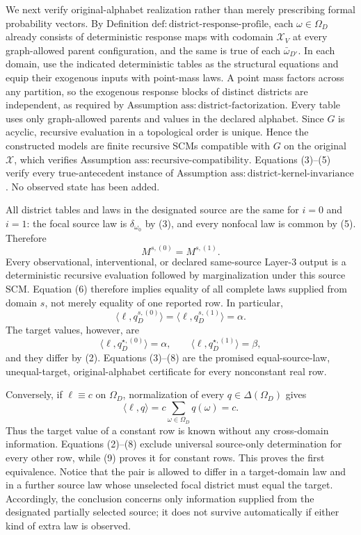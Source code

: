 We next verify original-alphabet realization rather than merely prescribing formal probability vectors.  By Definition \(\mathrm{def:district\text{-}response\text{-}profile}\), each \(\omega\in\Omega_D\) already consists of deterministic response maps with codomain \(\mathcal X_V\) at every graph-allowed parent configuration, and the same is true of each \(\bar\omega_{D'}\).  In each domain, use the indicated deterministic tables as the structural equations and equip their exogenous inputs with point-mass laws.  A point mass factors across any partition, so the exogenous response blocks of distinct districts are independent, as required by Assumption \(\mathrm{ass:district\text{-}factorization}\).  Every table uses only graph-allowed parents and values in the declared alphabet.  Since \(G\) is acyclic, recursive evaluation in a topological order is unique.  Hence the constructed models are finite recursive SCMs compatible with \(G\) on the original \(\mathcal X\), which verifies Assumption \(\mathrm{ass:recursive\text{-}compatibility}\).  Equations (3)--(5) verify every true-antecedent instance of Assumption \(\mathrm{ass:district\text{-}kernel\text{-}invariance}\).  No observed state has been added.

All district tables and laws in the designated source are the same for \(i=0\) and \(i=1\): the focal source law is \(\delta_{\omega_0}\) by (3), and every nonfocal law is common by (5).  Therefore
\[
M^{s,(0)}=M^{s,(1)}.
\tag{6}
\]
Every observational, interventional, or declared same-source Layer-3 output is a deterministic recursive evaluation followed by marginalization under this source SCM.  Equation (6) therefore implies equality of all complete laws supplied from domain \(s\), not merely equality of one reported row.  In particular,
\[
\langle\ell,q_D^{s,(0)}\rangle
=\langle\ell,q_D^{s,(1)}\rangle
=\alpha.
\tag{7}
\]
The target values, however, are
\[
\langle\ell,q_D^{\star,(0)}\rangle=\alpha,
\qquad
\langle\ell,q_D^{\star,(1)}\rangle=\beta,
\tag{8}
\]
and they differ by (2).  Equations (3)--(8) are the promised equal-source-law, unequal-target, original-alphabet certificate for every nonconstant real row.

Conversely, if \(\ell\equiv c\) on \(\Omega_D\), normalization of every \(q\in\Delta(\Omega_D)\) gives
\[
\langle\ell,q\rangle
=c\sum_{\omega\in\Omega_D}q(\omega)
=c.
\tag{9}
\]
Thus the target value of a constant row is known without any cross-domain information.  Equations (2)--(8) exclude universal source-only determination for every other row, while (9) proves it for constant rows.  This proves the first equivalence.  Notice that the pair is allowed to differ in a target-domain law and in a further source law whose unselected focal district must equal the target.  Accordingly, the conclusion concerns only information supplied from the designated partially selected source; it does not survive automatically if either kind of extra law is observed.

